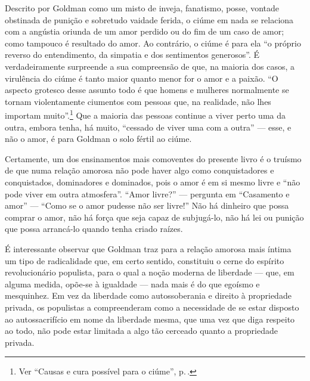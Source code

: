Descrito por Goldman como um misto de inveja, fanatismo, posse,
vontade obstinada de punição e sobretudo vaidade ferida, o ciúme em
nada se relaciona com a angústia oriunda de um amor perdido ou
do fim de um caso de amor; como tampouco é resultado do amor. Ao
contrário, o ciúme é para ela ``o próprio reverso do entendimento, da
simpatia e dos sentimentos generosos''. É verdadeiramente surpreende a
sua compreensão de que, na maioria dos casos, a virulência do ciúme é
tanto maior quanto menor for o amor e a paixão. ``O aspecto grotesco
desse assunto todo é que homens e mulheres normalmente se tornam violentamente
ciumentos com pessoas que, na realidade, não lhes importam muito''.\footnote{Ver ``Causas e cura possível para o ciúme'', p.\,\pageref{ciume}.} Que
a maioria das pessoas continue a viver perto uma da outra, embora
tenha, há muito, ``cessado de viver uma com a outra'' --- esse, e não o
amor, é para Goldman o solo fértil ao ciúme.

Certamente, um dos ensinamentos mais comoventes do presente livro é o
truísmo de que numa relação amorosa não pode haver algo como
conquistadores e conquistados, dominadores e dominados, pois o amor é em
si mesmo livre e ``não pode viver em outra atmosfera''. ``Amor livre?''
--- pergunta em ``Casamento e amor'' --- ``Como se o amor pudesse não ser
livre!'' Não há dinheiro que possa comprar o amor, não há força que seja
capaz de subjugá-lo, não há lei ou punição que possa arrancá-lo quando
tenha criado raízes.

É interessante observar que Goldman traz para a
relação amorosa mais íntima um tipo de radicalidade que, em certo
sentido, constituiu o cerne do espírito revolucionário populista, para o
qual a noção moderna de liberdade --- que, em alguma medida,
opõe-se à igualdade --- nada mais é do que egoísmo e mesquinhez. Em vez
da liberdade como autossoberania e direito à propriedade privada, os
populistas a compreenderam como a necessidade de se estar disposto ao
autossacrifício em nome da liberdade mesma, que uma vez que diga
respeito ao todo, não pode estar limitada a algo tão cerceado quanto a
propriedade privada.

